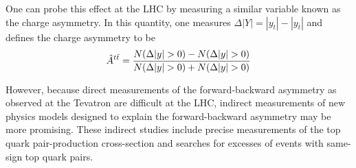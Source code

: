 One can probe this effect at the LHC by measuring a similar variable known as the charge asymmetry.
In this quantity, one measures $\Delta|Y| = |y_t| - |y_{\overline{t}} |$ and defines the charge asymmetry to be
\begin{equation}
  \hat{A}^{\ttbar} = \frac{N(\Delta |y|>0) - N(\Delta |y|>0)}{N(\Delta |y|>0) + N(\Delta |y|>0)}
\end{equation}



However, because direct measurements of the forward-backward asymmetry as observed at the Tevatron are difficult at the LHC, indirect measurements of new physics models designed to explain the forward-backward asymmetry may be more promising.
These indirect studies include precise measurements of the top quark pair-production cross-section and searches for excesses of events with same-sign top quark pairs.


